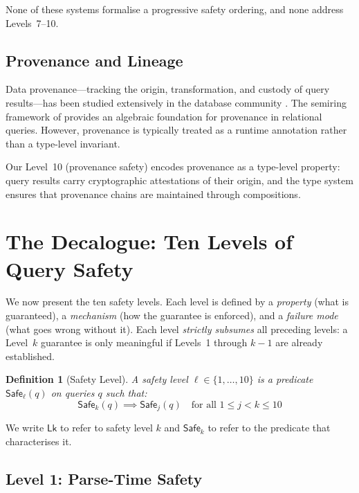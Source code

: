 \documentclass[11pt,a4paper]{article}
\newtheorem{definition}[theorem]{Definition}
\newcommand{\LevelN}[1]{\textsf{L#1}}
\newcommand{\Safe}[1]{\ensuremath{\mathsf{Safe}_{#1}}}
\begin{document}
None of these systems formalise a progressive safety ordering, and
none address Levels~7--10.

\subsection{Provenance and Lineage}

Data provenance---tracking the origin, transformation, and custody
of query results---has been studied extensively in the database
community \citep{cheney2009provenance,buneman2001and,green2007provenance}.
The semiring framework of \citet{green2007provenance} provides an
algebraic foundation for provenance in relational queries.  However,
provenance is typically treated as a runtime annotation rather than a
type-level invariant.

Our Level~10 (provenance safety) encodes provenance as a type-level
property: query results carry cryptographic attestations of their
origin, and the type system ensures that provenance chains are
maintained through compositions.

\section{The Decalogue: Ten Levels of Query Safety}\label{sec:decalogue}

We now present the ten safety levels.  Each level is defined by a
\emph{property} (what is guaranteed), a \emph{mechanism} (how the
guarantee is enforced), and a \emph{failure mode} (what goes wrong
without it).  Each level \emph{strictly subsumes} all preceding
levels: a Level~$k$ guarantee is only meaningful if Levels~1 through
$k-1$ are already established.

\begin{definition}[Safety Level]
A \emph{safety level} $\ell \in \{1, \ldots, 10\}$ is a predicate
$\Safe{\ell}(q)$ on queries $q$ such that:
\[
  \Safe{k}(q) \implies \Safe{j}(q) \quad \text{for all } 1 \leq j < k \leq 10
\]
\end{definition}

\noindent
We write $\LevelN{k}$ to refer to safety level $k$ and $\Safe{k}$ to
refer to the predicate that characterises it.

\subsection{Level 1: Parse-Time Safety}\label{sec:L1}
\end{document}
